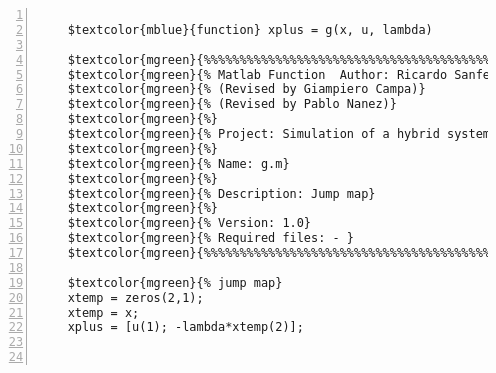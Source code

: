 %  
%  
%  
%  
  
  
\DefineShortVerb[fontfamily=courier,fontseries=m]{\$} 
\DefineShortVerb[fontfamily=courier,fontseries=b]{\#} 
  
\begin{Verbatim}[commandchars=\$\{\},numbers=left,numbersep=2pt] 

    $textcolor{mblue}{function} xplus = g(x, u, lambda) 
     
    $textcolor{mgreen}{%%%%%%%%%%%%%%%%%%%%%%%%%%%%%%%%%%%%%%%%%%%%%%%%%%%%%%%%%%%%%%%%%%%%%%%%%%%} 
    $textcolor{mgreen}{% Matlab Function  Author: Ricardo Sanfelice } 
    $textcolor{mgreen}{% (Revised by Giampiero Campa)} 
    $textcolor{mgreen}{% (Revised by Pablo Nanez)} 
    $textcolor{mgreen}{%} 
    $textcolor{mgreen}{% Project: Simulation of a hybrid system (Bouncing ball)} 
    $textcolor{mgreen}{%} 
    $textcolor{mgreen}{% Name: g.m} 
    $textcolor{mgreen}{%} 
    $textcolor{mgreen}{% Description: Jump map} 
    $textcolor{mgreen}{%} 
    $textcolor{mgreen}{% Version: 1.0} 
    $textcolor{mgreen}{% Required files: - } 
    $textcolor{mgreen}{%%%%%%%%%%%%%%%%%%%%%%%%%%%%%%%%%%%%%%%%%%%%%%%%%%%%%%%%%%%%%%%%%%%%%%%%%%%} 
     
    $textcolor{mgreen}{% jump map} 
    xtemp = zeros(2,1); 
    xtemp = x; 
    xplus = [u(1); -lambda*xtemp(2)]; 
     
      
\end{Verbatim}  
  
\UndefineShortVerb{\$} 
\UndefineShortVerb{\#} 
 